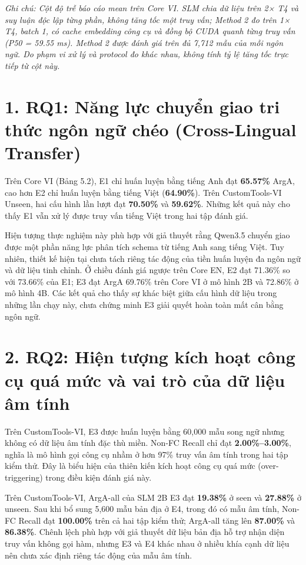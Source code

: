 \textit{Ghi chú: Cột độ trễ báo cáo mean trên Core VI. SLM chia dữ liệu trên 2× T4 và suy luận độc lập từng phần, không tăng tốc một truy vấn; Method 2 đo trên 1× T4, batch 1, có cache embedding công cụ và đồng bộ CUDA quanh từng truy vấn (P50 = 59.55 ms). Method 2 được đánh giá trên đủ 7,712 mẫu của mỗi ngôn ngữ. Do phạm vi xử lý và protocol đo khác nhau, không tính tỷ lệ tăng tốc trực tiếp từ cột này.}


\section{1. RQ1: Năng lực chuyển giao tri thức ngôn ngữ chéo (Cross-Lingual Transfer)}

Trên Core VI (Bảng 5.2), E1 chỉ huấn luyện bằng tiếng Anh đạt \textbf{65.57\%} ArgA, cao hơn E2 chỉ huấn luyện bằng tiếng Việt (\textbf{64.90\%}). Trên CustomTools-VI Unseen, hai cấu hình lần lượt đạt \textbf{70.50\%} và \textbf{59.62\%}. Những kết quả này cho thấy E1 vẫn xử lý được truy vấn tiếng Việt trong hai tập đánh giá.

Hiện tượng thực nghiệm này phù hợp với giả thuyết rằng Qwen3.5 chuyển giao được một phần năng lực phân tích schema từ tiếng Anh sang tiếng Việt. Tuy nhiên, thiết kế hiện tại chưa tách riêng tác động của tiền huấn luyện đa ngôn ngữ và dữ liệu tinh chỉnh. Ở chiều đánh giá ngược trên Core EN, E2 đạt 71.36\% so với 73.66\% của E1; E3 đạt ArgA 69.76\% trên Core VI ở mô hình 2B và 72.86\% ở mô hình 4B. Các kết quả cho thấy sự khác biệt giữa cấu hình dữ liệu trong những lần chạy này, chưa chứng minh E3 giải quyết hoàn toàn mất cân bằng ngôn ngữ.

\section{2. RQ2: Hiện tượng kích hoạt công cụ quá mức và vai trò của dữ liệu âm tính}

Trên CustomTools-VI, E3 được huấn luyện bằng 60,000 mẫu song ngữ nhưng không có dữ liệu âm tính đặc thù miền. Non-FC Recall chỉ đạt \textbf{2.00\%–3.00\%}, nghĩa là mô hình gọi công cụ nhầm ở hơn 97\% truy vấn âm tính trong hai tập kiểm thử. Đây là biểu hiện của thiên kiến kích hoạt công cụ quá mức (over-triggering) trong điều kiện đánh giá này.

Trên CustomTools-VI, ArgA-all của SLM 2B E3 đạt \textbf{19.38\%} ở seen và \textbf{27.88\%} ở unseen. Sau khi bổ sung 5,600 mẫu bản địa ở E4, trong đó có mẫu âm tính, Non-FC Recall đạt \textbf{100.00\%} trên cả hai tập kiểm thử; ArgA-all tăng lên \textbf{87.00\%} và \textbf{86.38\%}. Chênh lệch phù hợp với giả thuyết dữ liệu bản địa hỗ trợ nhận diện truy vấn không gọi hàm, nhưng E3 và E4 khác nhau ở nhiều khía cạnh dữ liệu nên chưa xác định riêng tác động của mẫu âm tính.

